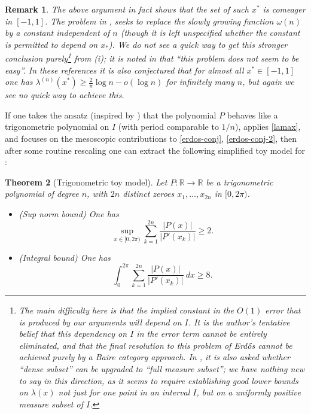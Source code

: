 \documentclass[12pt]{amsart}
\newtheorem{theorem}{Theorem}[section]
\newtheorem{remark}[theorem]{Remark}
\newcommand{\R}{\mathbb{R}}
\begin{document}
\begin{remark}\label{rem-baire}  The above argument in fact shows that the set of such $x^*$ is comeager in $[-1,1]$.
    The problem in \cite[p. 68]{erd-cluj}, \cite[Problem 1132]{bloom} seeks to replace the slowly growing function $\omega(n)$ by a constant independent of $n$ (though it is left unspecified whether the constant is permitted to depend on $x_*$).  We do not see a quick way to get this stronger conclusion purely\footnote{The main difficulty here is that the implied constant in the $O(1)$ error that is produced by our arguments will depend on $I$.  It is the author's tentative belief that this dependency on $I$ in the error term cannot be entirely eliminated, and that the final resolution to this problem of Erd\H{o}s cannot be achieved purely by a Baire category approach.  In \cite[p. 68]{erd-cluj}, \cite[Problem 1132]{bloom} it is also asked whether ``dense subset'' can be upgraded to ``full measure subset''; we have nothing new to say in this direction, as it seems to require establishing good lower bounds on $\lambda(x)$ not just for one point in an interval $I$, but on a uniformly positive measure subset of $I$.} from (i); it is noted in \cite[p. 68]{erd-cluj} that ``this problem does not seem to be easy''.  In these references it is also conjectured that for almost all $x^* \in [-1,1]$ one has $\lambda^{(n)}(x^*) \geq \frac{2}{\pi} \log n - o(\log n)$ for infinitely many $n$, but again we see no quick way to achieve this.
\end{remark}


If one takes the ansatz (inspired by ) that the polynomial $P$ behaves like a trigonometric polynomial on $I$ (with period comparable to $1/n$), applies \eqref{lamax}, and focuses on the mesoscopic contributions to \eqref{erdos-conj}, \eqref{erdos-conj-2}, then after some routine rescaling one can extract the following simplified toy model for :

\begin{theorem}[Trigonometric toy model]\label{toy}
Let $P \colon \R \to \R$ be a trigonometric polynomial of degree $n$, with $2n$ distinct zeroes $x_1,\dots,x_{2n}$ in $[0,2\pi)$.
\begin{itemize}
    \item[(i)] (Sup norm bound)  One has
    \begin{equation}\label{notr}
        \sup_{x \in [0,2\pi)} \sum_{k=1}^{2n} \frac{|P(x)|}{|P'(x_k)|} \geq 2.
    \end{equation}
    \item[(ii)]  (Integral bound)  One has
    \begin{equation}\label{integral}
     \int_0^{2\pi} \sum_{k=1}^{2n} \frac{|P(x)|}{|P'(x_k)|}\ dx \geq 8.
    \end{equation}
\end{itemize}
\end{theorem}
\end{document}
